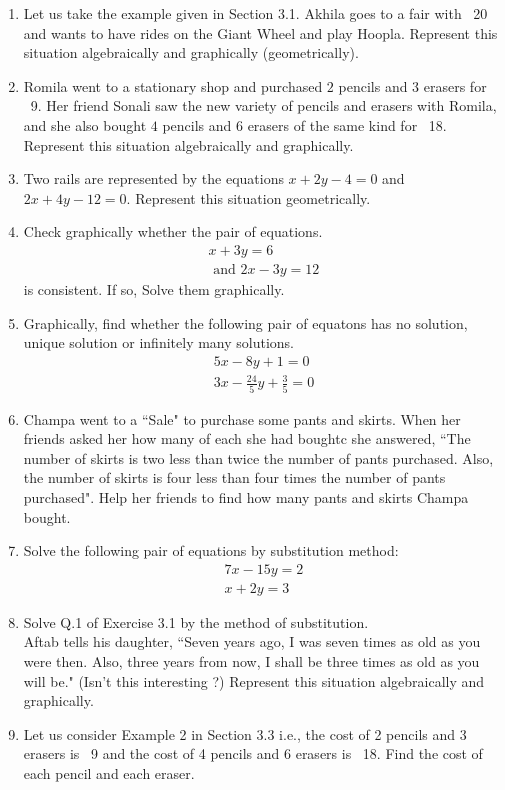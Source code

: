\begin{enumerate}
\item Let us take the example given in Section 3.1. Akhila goes to a fair with \rupee~20 and wants to have rides on the Giant Wheel and play Hoopla. Represent this situation algebraically and graphically (geometrically).
\item Romila went to a stationary shop and purchased $2$ pencils and $3$ erasers for \rupee~9. Her friend Sonali saw the new variety of pencils and erasers with Romila, and she also bought $4$ pencils and $6$ erasers of the same kind for \rupee~18. Represent this situation algebraically and graphically.
\item Two rails are represented by the equations $x+2y-4=0$ and $2x+4y-12=0$. Represent this situation geometrically.
\item Check graphically whether the pair of equations.
\begin{align}
x+3y = 6 \\ \text{ and } 2x-3y = 12
\end{align}
is consistent. If so, Solve them graphically.
\item Graphically, find whether the following pair of equatons has no solution, unique solution or infinitely many solutions.
\begin{align}
5x-8y+1 = 0 \\ 3x-\frac{24}{5}y+\frac{3}{5} = 0
\end{align}
\item Champa went to a ``Sale" to purchase some pants and skirts. When her friends asked her how many of each she had boughtc she answered, ``The number of skirts is two less than twice the number of pants purchased. Also, the number of skirts is four less than four times the number of pants purchased". Help her friends to find how many pants and skirts Champa bought.
\item Solve the following pair of equations by substitution method:
\begin{align}
7x-15y = 2 \\  x+2y = 3
\end{align}
\item Solve Q.1 of Exercise 3.1 by the method of substitution.
\\ Aftab tells his daughter, ``Seven years ago, I was seven times as old as you were then. Also, three years from now, I shall be three times as old as you will be."  (Isn't this interesting ?) Represent this situation algebraically and graphically.
\item Let us consider Example 2 in Section $3.3$ i.e., the cost of 2 pencils and 3 erasers is \rupee~9 and the cost of 4 pencils and 6 erasers is \rupee~18. Find the cost of each pencil and each eraser.

\end{enumerate}
